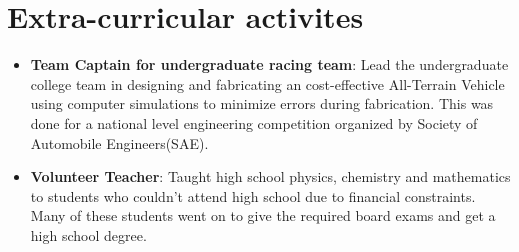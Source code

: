 \documentclass[letterpaper,11pt]{article}
\newcommand{\resumeItem}[2]{
  \item\small{
    \textbf{#1}{: #2 \vspace{-2pt}}
  }
}
\newcommand{\resumeSubItem}[2]{\resumeItem{#1}{#2}\vspace{-4pt}}
\newcommand{\resumeSubHeadingListStart}{\begin{itemize}[leftmargin=*]}
\newcommand{\resumeSubHeadingListEnd}{\end{itemize}}
\begin{document}
\section{Extra-curricular activites}
  \resumeSubHeadingListStart
    \resumeSubItem{Team Captain for undergraduate racing team}
      {Lead the undergraduate college team in designing and fabricating an cost-effective All-Terrain Vehicle using computer simulations to minimize errors during fabrication. This was done for a national level engineering competition organized by Society of Automobile Engineers(SAE).}
    \resumeSubItem{Volunteer Teacher}
      {Taught high school physics, chemistry and mathematics to students who couldn't attend high school due to financial constraints. Many of these students went on to give the required board exams and get a high school degree.}
  \resumeSubHeadingListEnd


%


\end{document}
